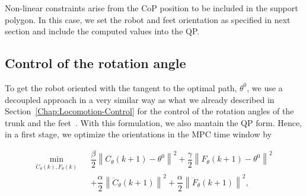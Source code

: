 

Non-linear constraints arise from the CoP position to be included in the support polygon. In this case, we set the robot and feet orientation as specified in next section and include the computed values into the QP.

\subsection{Control of the rotation angle}
To get the robot oriented with the tangent to the optimal path, $\theta^0$, we use a decoupled approach in a very similar way as what we already described in Section~\ref{Chap:Locomotion-Control} for the control of the rotation angles of the trunk and the feet~\citep{HerdtIROS2010}. With this formulation, we also mantain the QP form. Hence, in a first stage, we optimize the orientations in the MPC time window by  

\begin{eqnarray}
\nonumber
 \min\limits_{\dddot{C}_{\theta}(k),\dddot{F}_{\theta}(k)}  &&  \dfrac{\beta}{2} \left\| C_{\theta}(k+1) - \theta^{0} \right\|^2 + \dfrac{\gamma}{2} \left\| F_{\theta}(k+1) - \theta^{0} \right\|^2 \\
\nonumber && + \dfrac{\alpha}{2} \left\| \dddot{C}_{\theta}(k+1) \right\|^2 + \dfrac{\alpha}{2} \left\| \dddot{F}_{\theta}(k+1) \right\|^2,
\end{eqnarray}

